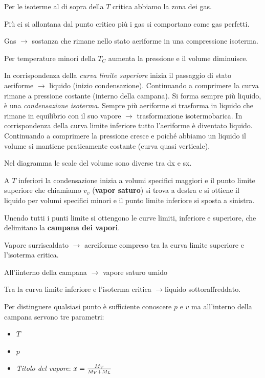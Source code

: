 \documentclass[a4paper]{article}
\numberwithin{equation}{section}%
\begin{document}
Per le isoterme al di sopra della $T$ critica abbiamo la zona dei gas.

Più ci si allontana dal punto critico più i gas si comportano come gas perfetti. 

Gas $\longrightarrow$ sostanza che rimane nello stato aeriforme in una compressione isoterma.

Per temperature minori della $T_C$  aumenta la pressione e il volume diminuisce. 


In corrispondenza della \textit{curva limite superiore} inizia il passaggio di stato aeriforme $\to$ liquido (inizio condensazione).  
Continuando a comprimere la curva rimane a pressione costante (interno della campana). Si forma sempre più liquido, è una \textit{condensazione isoterma}. Sempre più aeriforme si trasforma in liquido che rimane in equilibrio con il suo vapore $\rightarrow$ trasformazione isotermobarica. 
In corrispondenza della curva limite inferiore tutto l'aeriforme è diventato liquido. 
Continuando a comprimere la pressione cresce e poiché abbiamo un liquido il volume si mantiene praticamente costante (curva quasi verticale). 

Nel diagramma le scale del volume sono diverse tra dx e sx.

A $T$ inferiori la condensazione inizia a volumi specifici maggiori e il punto limite superiore che chiamiamo $v_v$ (\textbf{vapor saturo}) si trova a destra e  si ottiene il liquido per volumi specifici minori e il punto limite inferiore si sposta a sinistra.

Unendo tutti i punti limite si ottengono le curve limiti, inferiore e superiore, che delimitano la \textbf{campana dei vapori}.

Vapore surriscaldato $\longrightarrow$ aereiforme compreso tra la curva limite superiore e l'isoterma critica.

All'iinterno della campana $\longrightarrow $ vapore saturo umido

Tra la curva limite inferiore e l'isoterma critica $\longrightarrow$liquido sottoraffreddato.

Per distinguere qualsiasi punto è sufficiente conoscere $p$ e $v$ ma all'interno della campana servono tre parametri:\begin{itemize}
	\item $T$
	\item $p$
	\item \textit{Titolo del vapore}: $x={M_V\over M_V+M_L}$

\end{itemize}
\end{document}
